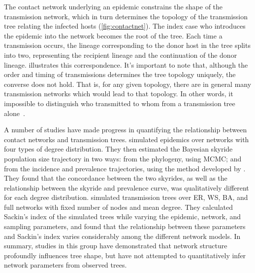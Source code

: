 The contact network underlying an epidemic constrains the shape of the
transmission network, which in turn determines the topology of the transmission
tree relating the infected hosts (\cref{fig:contactnet}). The index case who
introduces the epidemic into the network becomes the root of the tree. Each
time a transmission occurs, the lineage corresponding to the donor host in the
tree splits into two, representing the recipient lineage and the continuation
of the donor lineage.  illustrates this correspondence.
It's important to note that, although the order and timing of transmissions
determines the tree topology uniquely, the converse does not hold. That is, for
any given topology, there are in general many transmission networks which would
lead to that topology. In other words, it impossible to distinguish who
transmitted to whom from a transmission tree alone~\autocite{bernard2007hiv}.

A number of studies have made progress in quantifying the relationship between
contact networks and transmission trees. \textcite{o2010contact} simulated
epidemics over networks with four types of degree distribution. They then
estimated the Bayesian skyride~\autocite{minin2008smooth} population size
trajectory in two ways: from the phylogeny, using \gls{MCMC}; and from the
incidence and prevalence trajectories, using the method developed by 
\textcite{volz2009phylodynamics}. They found that the concordance between
the two skyrides, as well as the relationship between the skyride and
prevalence curve, was qualitatively different for each degree distribution.
\citeauthor{leventhal2012inferring} simulated transmission trees over \gls{ER},
\gls{WS}, \gls{BA}, and full networks with fixed number of nodes and mean
degree. They calculated Sackin's index of the simulated trees while varying the
epidemic, network, and sampling parameters, and found that the relationship
between these parameters and Sackin's index varies considerably among the
different network models. In summary, studies in this group have demonstrated
that network structure profoundly influences tree shape, but have not attempted
to quantitatively infer network parameters from observed trees.


